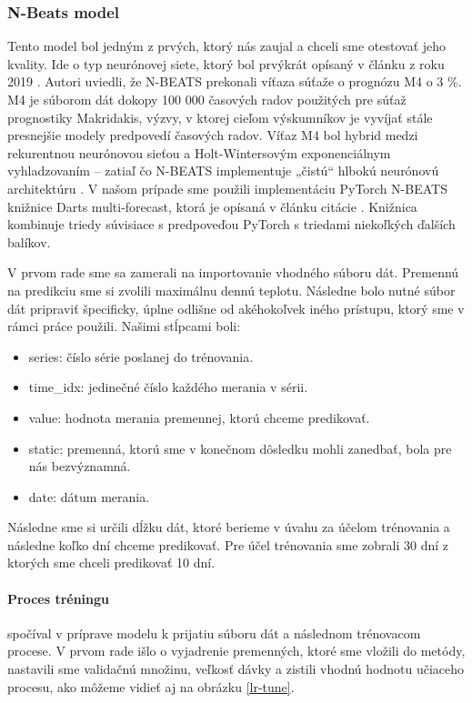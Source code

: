 \subsubsection{N-Beats model} 
Tento model bol jedným z prvých, ktorý nás zaujal a chceli sme otestovať jeho kvality. Ide o typ neurónovej siete, ktorý bol prvýkrát opísaný v článku z roku 2019 \cite{n-beats}. Autori uviedli, že N-BEATS prekonali víťaza súťaže o prognózu M4 o 3 \%. M4 je súborom dát dokopy 100 000 časových radov použitých pre súťaž prognostiky Makridakis, výzvy, v ktorej cieľom výskumníkov je vyvíjať stále presnejšie modely predpovedí časových radov. Víťaz M4 bol hybrid medzi rekurentnou neurónovou sieťou a Holt-Wintersovým exponenciálnym vyhladzovaním – zatiaľ čo N-BEATS implementuje „čistú“ hlbokú neurónovú architektúru \cite{m4}. V našom prípade sme použili implementáciu PyTorch N-BEATS knižnice Darts multi-forecast, ktorá je opísaná v článku citácie \cite{beat-impl}. Knižnica kombinuje triedy súvisiace s predpoveďou PyTorch s triedami niekoľkých ďalších balíkov. 

V prvom rade sme sa zamerali na importovanie vhodného súboru dát. Premennú na predikciu sme si zvolili maximálnu dennú teplotu. Následne bolo nutné súbor dát pripraviť špecificky, úplne odlišne od akéhokoľvek iného prístupu, ktorý sme v rámci práce použili. Našimi stĺpcami boli:
\begin{itemize}
    \item series: číslo série poslanej do trénovania.
    \item time\_idx: jedinečné číslo každého merania v sérii.
    \item value: hodnota merania premennej, ktorú chceme predikovať.
    \item static: premenná, ktorú sme v konečnom dôsledku mohli zanedbať, bola pre nás bezvýznamná.
    \item date: dátum merania.
\end{itemize}

Následne sme si určili dĺžku dát, ktoré berieme v úvahu za účelom trénovania a následne koľko dní chceme predikovať. Pre účel trénovania sme zobrali 30 dní z ktorých sme chceli predikovať 10 dní.

\paragraph{Proces tréningu} spočíval v príprave modelu k prijatiu súboru dát a následnom trénovacom procese. V prvom rade išlo o vyjadrenie premenných, ktoré sme vložili do metódy, nastavili sme validačnú množinu, veľkosť dávky a zistili vhodnú hodnotu učiaceho procesu, ako môžeme vidieť aj na obrázku \ref{lr-tune}. 

